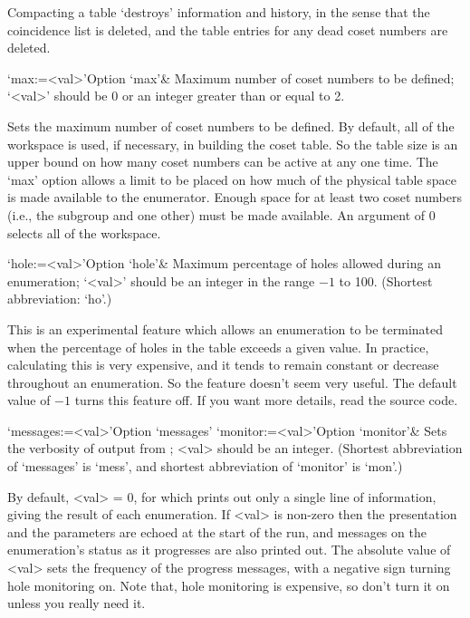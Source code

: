 Compacting a table \lq{}destroys'  information  and  history,  in  the
sense that the coincidence list is deleted, and the table entries  for
any dead coset numbers are deleted.

\>`max:=<val>'{Option `max'}&
Maximum number of coset numbers to be defined;
`<val>' should be $0$ or an integer greater than or equal to 2.

Sets the maximum  number of coset numbers to  be defined.  By default,
all  of the workspace  is used,  if necessary,  in building  the coset
table.  So the table size is  an upper bound on how many coset numbers
can be active at any one time.   The `max' option allows a limit to be
placed on  how much of the  physical table space is  made available to
the enumerator.   Enough space for  at least two coset  numbers (i.e.,
the subgroup and one other) must  be made available.  An argument of 0
selects all of the workspace.

\>`hole:=<val>'{Option `hole'}&
Maximum percentage of holes allowed during an enumeration;
`<val>' should be an integer in the range $-1$ to 100.
(Shortest abbreviation: `ho'.)

This is an experimental feature which  allows  an  enumeration  to  be
terminated when the percentage of holes in the table exceeds  a  given
value. In practice, calculating this is very expensive, and  it  tends
to remain constant or  decrease  throughout  an  enumeration.  So  the
feature doesn't seem very useful. The default value of $-1$ turns this
feature off. If you want more details, read the source code.

\enditems


\beginitems

\>`messages:=<val>'{Option `messages'}
\>`monitor:=<val>'{Option `monitor'}&
Sets the verbosity of output from {\ACE}; <val> should be an integer.
(Shortest  abbreviation  of  `messages'  is   `mess',   and   shortest
abbreviation of `monitor' is `mon'.)

By default, <val> = 0, for which {\ACE} prints out only a single  line
of information, giving the result of each  enumeration.  If  <val>  is
non-zero then the presentation and the parameters are  echoed  at  the
start of the run, and messages  on  the  enumeration's  status  as  it
progresses are also printed out. The absolute value of <val> sets  the
frequency of the progress messages, with a negative sign turning  hole
monitoring on. Note that, hole monitoring is expensive, so don't  turn
it on unless you really need it.

